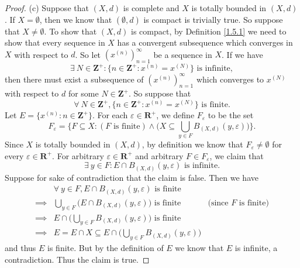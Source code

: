 \begin{proof}{(c)}
    Suppose that \((X, d)\) is complete and \(X\) is totally bounded in \((X, d)\).
    If \(X = \emptyset\), then we know that \((\emptyset, d)\) is compact is trivially true.
    So suppose that \(X \neq \emptyset\).
    To show that \((X, d)\) is compact, by Definition \ref{1.5.1} we need to show that every sequence in \(X\) has a convergent subsequence which converges in \(X\) with respect to \(d\).
    So let \((x^{(n)})_{n = 1}^\infty\) be a sequence in \(X\).
    If we have
    \[
        \exists\ N \in \mathbf{Z}^+ : \big\{n \in \mathbf{Z}^+ : x^{(n)} = x^{(N)}\big\} \text{ is infinite},
    \]
    then there must exist a subsequence of \((x^{(n)})_{n = 1}^\infty\) which converges to \(x^{(N)}\) with respect to \(d\) for some \(N \in \mathbf{Z}^+\).
    So suppose that
    \[
        \forall\ N \in \mathbf{Z}^+, \big\{n \in \mathbf{Z}^+ : x^{(n)} = x^{(N)}\big\} \text{ is finite}.
    \]
    Let \(E = \{x^{(n)} : n \in \mathbf{Z}^+\}\).
    For each \(\varepsilon \in \mathbf{R}^+\), we define \(F_\varepsilon\) to be the set
    \[
        F_\varepsilon = \Bigg\{F \subseteq X : (F \text{ is finite}) \land \bigg(X \subseteq \bigcup_{y \in F} B_{(X, d)}(y, \varepsilon)\bigg)\Bigg\}.
    \]
    Since \(X\) is totally bounded in \((X, d)\), by definition we know that \(F_\varepsilon \neq \emptyset\) for every \(\varepsilon \in \mathbf{R}^+\).
    For arbitrary \(\varepsilon \in \mathbf{R}^+\) and arbitrary \(F \in F_\varepsilon\), we claim that
    \[
        \exists\ y \in F : E \cap B_{(X, d)}(y, \varepsilon) \text{ is infinite}.
    \]
    Suppose for sake of contradiction that the claim is false.
    Then we have
    \begin{align*}
                 & \forall\ y \in F, E \cap B_{(X, d)}(y, \varepsilon) \text{ is finite}                                                   \\
        \implies & \bigcup_{y \in F} \bigg(E \cap B_{(X, d)}(y, \varepsilon)\bigg) \text{ is finite}      & \text{(since \(F\) is finite)} \\
        \implies & E \cap \bigg(\bigcup_{y \in F} B_{(X, d)}(y, \varepsilon)\bigg) \text{ is finite}                                       \\
        \implies & E = E \cap X \subseteq E \cap \bigg(\bigcup_{y \in F} B_{(X, d)}(y, \varepsilon)\bigg)
    \end{align*}
    and thus \(E\) is finite.
    But by the definition of \(E\) we know that \(E\) is infinite, a contradiction.
    Thus the claim is true.


\end{proof}
